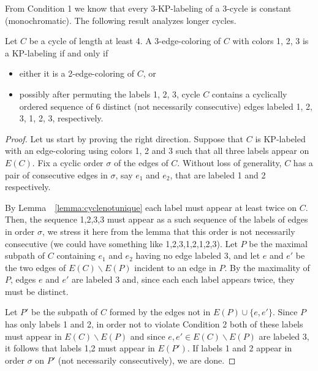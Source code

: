 \documentclass[12pt,a4paper,titlepage,openany]{report}
\begin{document}
From Condition 1 we know that every 3-KP-labeling of a 3-cycle is constant (monochromatic). The following result analyzes longer cycles.
\begin{lemma}\label{123123}
Let $C$ be a cycle of length at least 4. A 3-edge-coloring of $C$ with colors 1, 2, 3 is a KP-labeling if and only if
\begin{itemize}
\item either it is a 2-edge-coloring of $C$, or
\item possibly after permuting the labels 1, 2, 3, cycle $C$ contains a cyclically ordered sequence
of 6 distinct (not necessarily consecutive) edges labeled 1, 2, 3, 1, 2, 3, respectively. 
\end{itemize}
\end{lemma}

\begin{proof}
Let us start by proving the right direction. Suppose that $C$ is KP-labeled with an edge-coloring using colors 1, 2 and 3 such that all three labels appear on $E(C)$. Fix a cyclic order $\sigma$ of the edges of $C$. Without loss of generality, $C$ has a pair of consecutive edges in $\sigma$, say $e_1$ and $e_2$, that are labeled 1 and 2 respectively. 

By Lemma~~\ref{lemma:cyclenotunique} each label must appear at least twice on $C$. Then, the sequence 1,2,3,3 must appear as a such sequence of the labels of edges in order $\sigma$, we stress it here from the lemma that this order is not necessarily consecutive (we could have something like 1,2,3,1,2,1,2,3). Let $P$ be the maximal subpath of $C$ containing $e_1$ and $e_2$ having no edge labeled 3, and let $e$ and $e'$ be the two edges of $E(C)\backslash E(P)$ incident to an edge in $P$. By the maximality of $P$, edges $e$ and $e'$ are labeled 3 and, since each each label appears twice, they must be distinct. 

Let $P'$ be the subpath of $C$ formed by the edges not in $E(P)\cup \{ e,e'\}$. Since $P$ has only labels 1 and 2, in order not to violate Condition 2 both of these labels must appear in $E(C)\backslash E(P)$ and since $e,e' \in E(C)\backslash E(P)$ are labeled 3, it follows that labels 1,2 must appear in $E(P')$. If labels 1 and 2 appear in order $\sigma$ on $P'$ (not necessarily consecutively), we are done. 


\end{proof}
\end{document}
